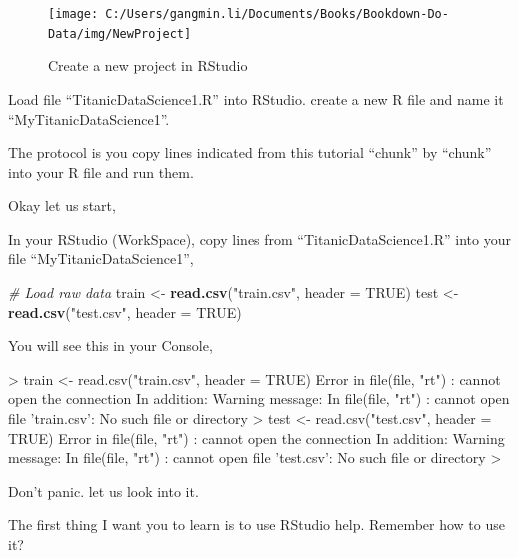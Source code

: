 \documentclass[
]{book}
\newenvironment{Shaded}{\begin{snugshade}}{\end{snugshade}}
\newcommand{\CommentTok}[1]{\textcolor[rgb]{0.56,0.35,0.01}{\textit{#1}}}
\newcommand{\DataTypeTok}[1]{\textcolor[rgb]{0.13,0.29,0.53}{#1}}
\newcommand{\KeywordTok}[1]{\textcolor[rgb]{0.13,0.29,0.53}{\textbf{#1}}}
\newcommand{\NormalTok}[1]{#1}
\newcommand{\OtherTok}[1]{\textcolor[rgb]{0.56,0.35,0.01}{#1}}
\newcommand{\StringTok}[1]{\textcolor[rgb]{0.31,0.60,0.02}{#1}}
\begin{document}
\begin{figure}

{\centering \texttt{[image: C:/Users/gangmin.li/Documents/Books/Bookdown-Do-Data/img/NewProject]} 

}

\caption{Create a new project in RStudio }\label{fig:newproject}
\end{figure}

Load file ``TitanicDataScience1.R'' into RStudio. create a new R file and name it ``MyTitanicDataScience1''.

The protocol is you copy lines indicated from this tutorial ``chunk'' by ``chunk'' into your R file and run them.

Okay let us start,

In your RStudio (WorkSpace), copy lines from ``TitanicDataScience1.R'' into your file ``MyTitanicDataScience1'',

\begin{Shaded}
\begin{Highlighting}[]
\CommentTok{# Load raw data}
\NormalTok{train <-}\StringTok{ }\KeywordTok{read.csv}\NormalTok{(}\StringTok{"train.csv"}\NormalTok{, }\DataTypeTok{header =} \OtherTok{TRUE}\NormalTok{)}
\NormalTok{test <-}\StringTok{ }\KeywordTok{read.csv}\NormalTok{(}\StringTok{"test.csv"}\NormalTok{, }\DataTypeTok{header =} \OtherTok{TRUE}\NormalTok{)}
\end{Highlighting}
\end{Shaded}

You will see this in your Console,

\begin{Shaded}
\begin{Highlighting}[]
\NormalTok{>}\DataTypeTok{ train <- read.csv("train.csv", header = TRUE)}
\DataTypeTok{Error in file(file, "rt") : cannot open the connection}
\DataTypeTok{In addition: Warning message:}
\DataTypeTok{In file(file, "rt") :}
\DataTypeTok{  cannot open file 'train.csv': No such file or directory}
\DataTypeTok{> test <- read.csv("test.csv", header = TRUE)}
\DataTypeTok{Error in file(file, "rt") : cannot open the connection}
\DataTypeTok{In addition: Warning message:}
\DataTypeTok{In file(file, "rt") :}
\DataTypeTok{  cannot open file 'test.csv': No such file or directory}
\DataTypeTok{> }
\end{Highlighting}
\end{Shaded}

Don't panic. let us look into it.

The first thing I want you to learn is to use RStudio help. Remember how to use it?
\end{document}
